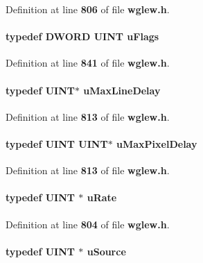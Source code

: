 Definition at line {\bf 806} of file {\bf wglew.\+h}.

\paragraph[{u\+Flags}]{\setlength{\rightskip}{0pt plus 5cm}typedef D\+W\+O\+RD {\bf U\+I\+NT} {\bf u\+Flags}}\label{wglew_8h_af49e403ee7327a56b7b06812c26960a7}


Definition at line {\bf 841} of file {\bf wglew.\+h}.

\paragraph[{u\+Max\+Line\+Delay}]{\setlength{\rightskip}{0pt plus 5cm}typedef {\bf U\+I\+NT}$\ast$ {\bf u\+Max\+Line\+Delay}}\label{wglew_8h_a9815b143fd3dd51430535aca34ddf3b2}


Definition at line {\bf 813} of file {\bf wglew.\+h}.

\paragraph[{u\+Max\+Pixel\+Delay}]{\setlength{\rightskip}{0pt plus 5cm}typedef {\bf U\+I\+NT} {\bf U\+I\+NT}$\ast$ {\bf u\+Max\+Pixel\+Delay}}\label{wglew_8h_abc9a169ec16cbe695616f6612c73d770}


Definition at line {\bf 813} of file {\bf wglew.\+h}.

\paragraph[{u\+Rate}]{\setlength{\rightskip}{0pt plus 5cm}typedef {\bf U\+I\+NT} $\ast$ {\bf u\+Rate}}\label{wglew_8h_a1ce22fbd429733831a7a5fbf2e563ced}


Definition at line {\bf 804} of file {\bf wglew.\+h}.

\paragraph[{u\+Source}]{\setlength{\rightskip}{0pt plus 5cm}typedef {\bf U\+I\+NT} $\ast$ {\bf u\+Source}}\label{wglew_8h_a375f9a7c9f48a12795e90482255aff5f}


